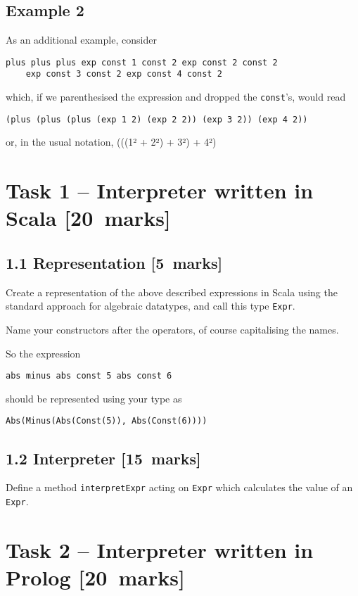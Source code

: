 \documentclass[11pt]{article}
\begin{document}
\subsection*{Example 2}
\label{sec:org1e7e2a5}
As an additional example, consider
\begin{verbatim}
plus plus plus exp const 1 const 2 exp const 2 const 2
    exp const 3 const 2 exp const 4 const 2
\end{verbatim}
which, if we parenthesised the expression and dropped the \texttt{const}'s, would read
\begin{verbatim}
(plus (plus (plus (exp 1 2) (exp 2 2)) (exp 3 2)) (exp 4 2))
\end{verbatim}
or, in the usual notation,
(((1² + 2²) + 3²) + 4²)

\section*{Task 1 – Interpreter written in Scala  [20 marks]}
\label{sec:orgda65bc2}
\subsection*{1.1 Representation [5 marks]}
\label{sec:org5a7c6b7}
Create a representation of the above described expressions
in Scala using the standard approach for algebraic datatypes,
and call this type \texttt{Expr}.

Name your constructors after the operators,
of course capitalising the names.

So the expression
\begin{verbatim}
abs minus abs const 5 abs const 6
\end{verbatim}
should be represented using your type as
\begin{verbatim}
Abs(Minus(Abs(Const(5)), Abs(Const(6))))
\end{verbatim}

\subsection*{1.2 Interpreter    [15 marks]}
\label{sec:org0051e23}
Define a method \texttt{interpretExpr} acting on \texttt{Expr} which
calculates the value of an \texttt{Expr}.

\section*{Task 2 – Interpreter written in Prolog [20 marks]}
\label{sec:orgf7d46aa}
\end{document}
